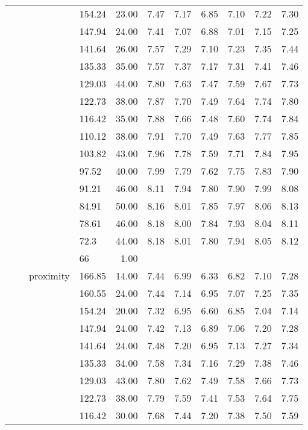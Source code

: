 \begin{longtable}{llllrrrrrrr}
   &  &  & 154.24 & 23.00 & 7.47 & 7.17 & 6.85 & 7.10 & 7.22 & 7.30 \\ 
   &  &  & 147.94 & 24.00 & 7.41 & 7.07 & 6.88 & 7.01 & 7.15 & 7.25 \\ 
   &  &  & 141.64 & 26.00 & 7.57 & 7.29 & 7.10 & 7.23 & 7.35 & 7.44 \\ 
   &  &  & 135.33 & 35.00 & 7.57 & 7.37 & 7.17 & 7.31 & 7.41 & 7.46 \\ 
   &  &  & 129.03 & 44.00 & 7.80 & 7.63 & 7.47 & 7.59 & 7.67 & 7.73 \\ 
   &  &  & 122.73 & 38.00 & 7.87 & 7.70 & 7.49 & 7.64 & 7.74 & 7.80 \\ 
   &  &  & 116.42 & 35.00 & 7.88 & 7.66 & 7.48 & 7.60 & 7.74 & 7.84 \\ 
   &  &  & 110.12 & 38.00 & 7.91 & 7.70 & 7.49 & 7.63 & 7.77 & 7.85 \\ 
   &  &  & 103.82 & 43.00 & 7.96 & 7.78 & 7.59 & 7.71 & 7.84 & 7.95 \\ 
   &  &  & 97.52 & 40.00 & 7.99 & 7.79 & 7.62 & 7.75 & 7.83 & 7.90 \\ 
   &  &  & 91.21 & 46.00 & 8.11 & 7.94 & 7.80 & 7.90 & 7.99 & 8.08 \\ 
   &  &  & 84.91 & 50.00 & 8.16 & 8.01 & 7.85 & 7.97 & 8.06 & 8.13 \\ 
   &  &  & 78.61 & 46.00 & 8.18 & 8.00 & 7.84 & 7.93 & 8.04 & 8.11 \\ 
   &  &  & 72.3 & 44.00 & 8.18 & 8.01 & 7.80 & 7.94 & 8.05 & 8.12 \\ 
   &  &  & 66 & 1.00 &  &  &  &  &  &  \\ 
   &  & proximity & 166.85 & 14.00 & 7.44 & 6.99 & 6.33 & 6.82 & 7.10 & 7.28 \\ 
   &  &  & 160.55 & 24.00 & 7.44 & 7.14 & 6.95 & 7.07 & 7.25 & 7.35 \\ 
   &  &  & 154.24 & 20.00 & 7.32 & 6.95 & 6.60 & 6.85 & 7.04 & 7.14 \\ 
   &  &  & 147.94 & 24.00 & 7.42 & 7.13 & 6.89 & 7.06 & 7.20 & 7.28 \\ 
   &  &  & 141.64 & 24.00 & 7.48 & 7.20 & 6.95 & 7.13 & 7.27 & 7.34 \\ 
   &  &  & 135.33 & 34.00 & 7.58 & 7.34 & 7.16 & 7.29 & 7.38 & 7.46 \\ 
   &  &  & 129.03 & 43.00 & 7.80 & 7.62 & 7.49 & 7.58 & 7.66 & 7.73 \\ 
   &  &  & 122.73 & 38.00 & 7.79 & 7.59 & 7.41 & 7.53 & 7.64 & 7.75 \\ 
   &  &  & 116.42 & 30.00 & 7.68 & 7.44 & 7.20 & 7.38 & 7.50 & 7.59 \\ 

\end{longtable}
